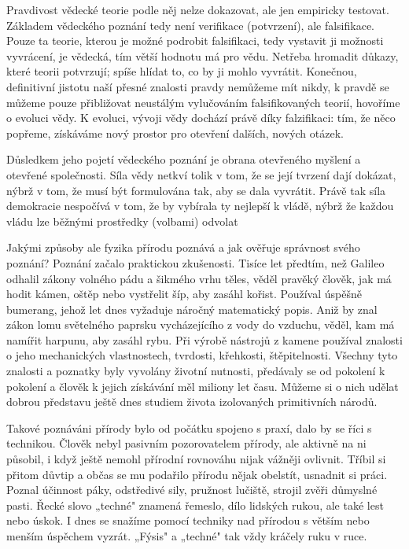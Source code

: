 \begin{tcnote}
        \tcblower
        Pravdivost vědecké teorie podle něj nelze dokazovat, ale jen empiricky testovat. Základem
        vědeckého poznání tedy není verifikace (potvrzení), ale falsifikace. Pouze ta teorie, kterou
        je možné podrobit falsifikaci, tedy vystavit ji možnosti vyvrácení, je vědecká, tím větší
        hodnotu má pro vědu. Netřeba hromadit důkazy, které teorii potvrzují; spíše hlídat to, co by
        ji mohlo vyvrátit. Konečnou, definitivní jistotu naší přesné znalosti pravdy nemůžeme mít
        nikdy, k pravdě se můžeme pouze přibližovat neustálým vylučováním falsifikovaných teorií,
        hovoříme o evoluci vědy. K evoluci, vývoji vědy dochází právě díky falzifikaci: tím, že něco
        popřeme, získáváme nový prostor pro otevření dalších, nových otázek.

        Důsledkem jeho pojetí vědeckého poznání je obrana otevřeného myšlení a otevřené společnosti.
        Síla vědy netkví tolik v tom, že se její tvrzení dají dokázat, nýbrž v tom, že musí být
        formulována tak, aby se dala vyvrátit. Právě tak síla demokracie nespočívá v tom, že by
        vybírala ty nejlepší k vládě, nýbrž že každou vládu lze běžnými prostředky (volbami) odvolat
      \end{tcnote}

      Jakými způsoby ale fyzika přírodu poznává a jak ověřuje správnost svého poznání? Poznání
      začalo praktickou zkušenosti. Tisíce let předtím, než Galileo odhalil zákony volného pádu a
      šikmého vrhu těles, věděl pravěký člověk, jak má hodit kámen, oštěp nebo vystřelit šíp, aby
      zasáhl kořist. Používal úspěšně bumerang, jehož let dnes vyžaduje náročný matematický popis.
      Aniž by znal zákon lomu světelného paprsku vycházejícího z vody do vzduchu, věděl, kam má
      namířit harpunu, aby zasáhl rybu. Při výrobě nástrojů z kamene používal znalosti o jeho
      mechanických vlastnostech, tvrdosti, křehkosti, štěpitelnosti. Všechny tyto znalosti a
      poznatky byly vyvolány životní nutnosti, předávaly se od pokolení k pokolení a člověk k jejich
      získávání měl miliony let času. Můžeme si o nich udělat dobrou představu ještě dnes studiem
      života izolovaných primitivních národů.

      Takové poznáváni přírody bylo od počátku spojeno s praxí, dalo by se říci s technikou. Člověk
      nebyl pasivním pozorovatelem přírody, ale aktivně na ni působil, i když ještě nemohl přírodní
      rovnováhu nijak vážněji ovlivnit. Tříbil si přitom důvtip a občas se mu podařilo přírodu nějak
      obelstít, usnadnit si práci. Poznal účinnost páky, odstředivé sily, pružnost lučiště, strojil
      zvěři důmyslné pasti. Řecké slovo „techné" znamená řemeslo, dílo lidských rukou, ale také lest
      nebo úskok. I dnes se snažíme pomocí techniky nad přírodou s větším nebo menším úspěchem
      vyzrát. „Fýsis" a „techné" tak vždy kráčely ruku v ruce. 

